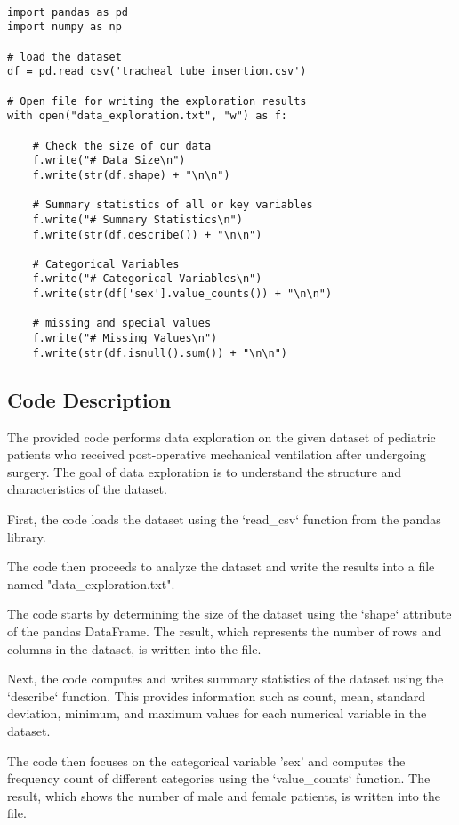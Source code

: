 \documentclass[11pt]{article}
\begin{document}
\begin{verbatim}

import pandas as pd
import numpy as np

# load the dataset
df = pd.read_csv('tracheal_tube_insertion.csv')

# Open file for writing the exploration results
with open("data_exploration.txt", "w") as f:

    # Check the size of our data
    f.write("# Data Size\n")
    f.write(str(df.shape) + "\n\n")

    # Summary statistics of all or key variables
    f.write("# Summary Statistics\n")
    f.write(str(df.describe()) + "\n\n")

    # Categorical Variables
    f.write("# Categorical Variables\n")
    f.write(str(df['sex'].value_counts()) + "\n\n")

    # missing and special values
    f.write("# Missing Values\n")
    f.write(str(df.isnull().sum()) + "\n\n")

\end{verbatim}

\subsection{Code Description}

The provided code performs data exploration on the given dataset of pediatric patients who received post-operative mechanical ventilation after undergoing surgery. The goal of data exploration is to understand the structure and characteristics of the dataset.

First, the code loads the dataset using the `read\_csv` function from the pandas library. 

The code then proceeds to analyze the dataset and write the results into a file named "data\_exploration.txt". 

The code starts by determining the size of the dataset using the `shape` attribute of the pandas DataFrame. The result, which represents the number of rows and columns in the dataset, is written into the file.

Next, the code computes and writes summary statistics of the dataset using the `describe` function. This provides information such as count, mean, standard deviation, minimum, and maximum values for each numerical variable in the dataset.

The code then focuses on the categorical variable 'sex' and computes the frequency count of different categories using the `value\_counts` function. The result, which shows the number of male and female patients, is written into the file.
\end{document}
